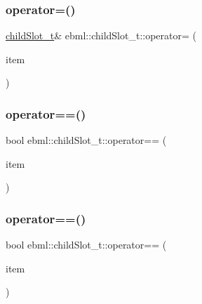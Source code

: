 \mbox{\label{classebml_1_1childSlot__t_a2ba7c72c369a0809108f00b547a3cd80}} 
\subsubsection{\texorpdfstring{operator=()}{operator=()}\hspace{0.1cm}{\footnotesize\ttfamily [3/3]}}
{\footnotesize\ttfamily \mbox{\hyperlink{classebml_1_1childSlot__t}{child\+Slot\+\_\+t}}\& ebml\+::child\+Slot\+\_\+t\+::operator= (\begin{DoxyParamCaption}\item[{\mbox{\hyperlink{namespaceebml_adad533b7705a16bb360fe56380c5e7be}{ebml\+Element\+\_\+sp}} \&\&}]{item }\end{DoxyParamCaption})}

\mbox{\label{classebml_1_1childSlot__t_a80a7118d11ff7651bb173a4a2d599fa1}} 
\subsubsection{\texorpdfstring{operator==()}{operator==()}\hspace{0.1cm}{\footnotesize\ttfamily [1/3]}}
{\footnotesize\ttfamily bool ebml\+::child\+Slot\+\_\+t\+::operator== (\begin{DoxyParamCaption}\item[{const \mbox{\hyperlink{namespaceebml_adad533b7705a16bb360fe56380c5e7be}{ebml\+Element\+\_\+sp}} \&}]{item }\end{DoxyParamCaption})}

\mbox{\label{classebml_1_1childSlot__t_a1fc9c424a86ba33d68b6a280f3c3fd83}} 
\subsubsection{\texorpdfstring{operator==()}{operator==()}\hspace{0.1cm}{\footnotesize\ttfamily [2/3]}}
{\footnotesize\ttfamily bool ebml\+::child\+Slot\+\_\+t\+::operator== (\begin{DoxyParamCaption}\item[{const \mbox{\hyperlink{namespaceebml_a2deef4e8071531b32e3533f1bf978917}{c\+\_\+ebml\+Element\+\_\+sp}} \&}]{item }\end{DoxyParamCaption})}

